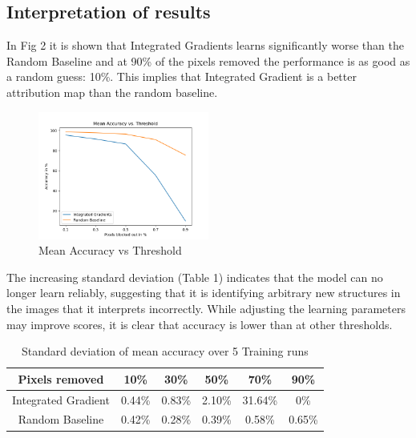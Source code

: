 \documentclass[conference]{IEEEtran}
\begin{document}
\subsection{Interpretation of results}

In Fig 2 it is shown that Integrated Gradients learns significantly worse than the Random Baseline and at 90\% of the pixels removed the performance is as good as a random guess: 10\%. This implies that Integrated Gradient is a better attribution map than the random baseline.


\begin{figure}[h]
	\centering
	\includegraphics[width=0.5\textwidth]{figs/mean_accuracy_vs_threshold.png}
	\caption{Mean Accuracy vs Threshold}
	\label{fig:mean_accuracy}
\end{figure}


\newpage

The increasing standard deviation (Table 1) indicates that the model can no longer learn reliably, suggesting that it is identifying arbitrary new structures in the images that it interprets incorrectly. While adjusting the learning parameters may improve scores, it is clear that accuracy is lower than at other thresholds.

\begin{table}[ht]
	\centering
	\begin{tabular}{|c|c|c|c|c|c|}
		\hline
		Pixels removed & 10\% & 30\% & 50\% & 70\% & 90\% \\
		\hline
		Integrated Gradient & 0.44\% & 0.83\% & 2.10\% & 31.64\% & 0\% \\
		Random Baseline  & 0.42\% & 0.28\% & 0.39\% & 0.58\% & 0.65\% \\
		\hline	
	\end{tabular} \newline
	
	\caption{Standard deviation of mean accuracy over 5 Training runs}
	\label{tab:std_deviation}
\end{table}
\end{document}
